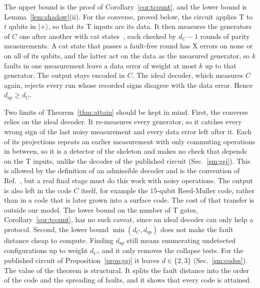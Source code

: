 \documentclass[aps,prl,reprint,twocolumn,amsmath,amssymb,floatfix,nofootinbib,superscriptaddress]{revtex4-2}
\theoremstyle{definition}
\theoremstyle{remark}
\begin{document}
The upper bound is the proof of Corollary~\ref{cor:tcount}, and the lower bound is Lemma~\ref{lem:shadow}(ii). For the converse, proved below, the circuit applies T to $t$ qubits in $|{+}\rangle$, so that its T inputs are its data. It then measures the generators of $C$ one after another with cat states~\cite{shor}, each checked by $d_C-1$ rounds of parity measurements. A cat state that passes a fault-free round has X errors on none or on all of its qubits, and the latter act on the data as the measured generator, so $k$ faults in one measurement leave a data error of weight at most $k$ up to that generator. The output stays encoded in $C$. The ideal decoder, which measures $C$ again, rejects every run whose recorded signs disagree with the data error. Hence $d_{\mathrm{sp}}\geq d_C$.

Two limits of Theorem~\ref{thm:attain} should be kept in mind. First, the converse relies on the ideal decoder. It re-measures every generator, so it catches every wrong sign of the last noisy measurement and every data error left after it. Each of its projections repeats an earlier measurement with only commuting operations in between, so it is a detector of the skeleton and makes no check that depends on the T inputs, unlike the decoder of the published circuit (Sec.~\ref{sm:gsj}). This is allowed by the definition of an admissible decoder and is the convention of Ref.~\cite{cultivation}, but a real final stage must do this work with noisy operations. The output is also left in the code $C$ itself, for example the $15$-qubit Reed-Muller code, rather than in a code that is later grown into a surface code. The cost of that transfer is outside our model. The lower bound on the number of T gates, Corollary~\ref{cor:tcount}, has no such caveat, since an ideal decoder can only help a protocol. Second, the lower bound $\min(d_C,d_{\mathrm{sp}})$ does not make the fault distance cheap to compute. Finding $d_{\mathrm{sp}}$ still means enumerating undetected configurations up to weight $d_C$, and it only removes the collapse tests. For the published circuit of Proposition~\ref{prop:gsj} it leaves $d\in\{2,3\}$ (Sec.~\ref{sm:codes}). The value of the theorem is structural. It splits the fault distance into the order of the code and the spreading of faults, and it shows that every code is attained.
\end{document}
